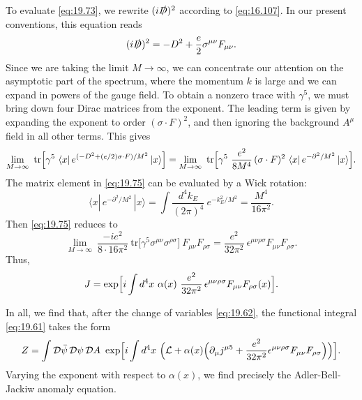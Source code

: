 To evaluate \eqref{eq:19.73}, we rewrite $(i\slashed{D})^2$ according to
\eqref{eq:16.107}.  In our present conventions, this equation reads
\begin{equation}
  (i\slashed{D})^2 = -D^2 + \frac{e}{2}\sigma^{\mu\nu}F_{\mu\nu} .
  \label{eq:19.74}
\end{equation}
Since we are taking the limit $M\to\infty$, we can concentrate our attention
on the asymptotic part of the spectrum, where the momentum $k$ is large and
we can expand in powers of the gauge field.  To obtain a nonzero trace with
$\gamma^5$, we must bring down four Dirac matrices from the exponent.  The
leading term is given by expanding the exponent to order $(\sigma\cdot F)^2$,
and then ignoring the background $A^\mu$ field in all other terms.  This gives
\begin{equation}
  \lim_{M\to\infty}\ \mathrm{tr}\Bigl[ \gamma^5\ \langle x|\,
    e^{(-D^2+(e/2)\sigma\cdot F)/M^2}\,|x\rangle \Bigr]
  = \lim_{M\to\infty}\ \mathrm{tr}\Bigl[ \gamma^5\ \frac{e^2}{8M^4}\,
    (\sigma\cdot F)^2\ \langle x|\,e^{-\partial^2/M^2}\,|x\rangle \Bigr] .
  \label{eq:19.75}
\end{equation}
The matrix element in \eqref{eq:19.75} can be evaluated by a Wick rotation:
\begin{equation}
  \langle x|\,e^{-\partial^2/M^2}\,|x\rangle
  = \int \frac{d^4k_E}{(2\pi)^4}\ e^{-k_E^2/M^2}
  = \frac{M^4}{16\pi^2} .
  \label{eq:19.76}
\end{equation}
Then \eqref{eq:19.75} reduces to
\begin{equation}
  \lim_{M\to\infty}\ \frac{-ie^2}{8\cdot16\pi^2}\ \mathrm{tr}\bigl[
    \gamma^5\sigma^{\mu\nu}\sigma^{\rho\sigma} \bigr]\ F_{\mu\nu}F_{\rho\sigma}
  = \frac{e^2}{32\pi^2}\ \epsilon^{\mu\nu\rho\sigma}F_{\mu\nu}F_{\rho\sigma}
  .
  \label{eq:19.77}
\end{equation}
Thus,
\begin{equation}
  J = \exp\Bigl[ i\int d^4x\ \alpha(x)\ \frac{e^2}{32\pi^2}\,
    \epsilon^{\mu\nu\rho\sigma}F_{\mu\nu}F_{\rho\sigma}(x) \Bigr] .
  \label{eq:19.78}
\end{equation}

In all, we find that, after the change of variables \eqref{eq:19.62}, the
functional integral \eqref{eq:19.61} takes the form
\begin{equation}
  Z = \int \mathcal{D}\bar{\psi}\,\mathcal{D}\psi\,\mathcal{D}A\ \exp\Bigl[
    i\int d^4x\ \Bigl( \mathcal{L} + \alpha(x)\Bigl( \partial_\mu j^{\mu 5}
      + \frac{e^2}{32\pi^2}\epsilon^{\mu\nu\rho\sigma}F_{\mu\nu}F_{\rho\sigma}
      \Bigr) \Bigr) \Bigr] .
  \label{eq:19.79}
\end{equation}
Varying the exponent with respect to $\alpha(x)$, we find precisely the
Adler-Bell-Jackiw anomaly equation.

